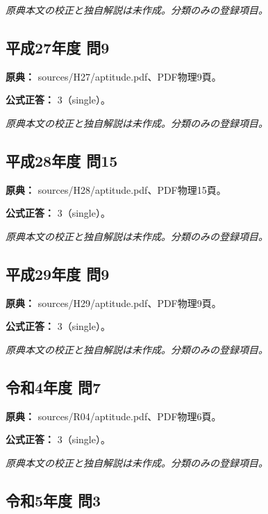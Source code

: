 \par\textit{原典本文の校正と独自解説は未作成。分類のみの登録項目。}

\subsection{平成27年度 問9}
\label{q:h27-reg-apt-09}

\noindent\textbf{原典：} sources/H27/aptitude.pdf、PDF物理9頁。

\textbf{公式正答：} 3（single）。

\par\textit{原典本文の校正と独自解説は未作成。分類のみの登録項目。}

\subsection{平成28年度 問15}
\label{q:h28-reg-apt-15}

\noindent\textbf{原典：} sources/H28/aptitude.pdf、PDF物理15頁。

\textbf{公式正答：} 3（single）。

\par\textit{原典本文の校正と独自解説は未作成。分類のみの登録項目。}

\subsection{平成29年度 問9}
\label{q:h29-reg-apt-09}

\noindent\textbf{原典：} sources/H29/aptitude.pdf、PDF物理9頁。

\textbf{公式正答：} 3（single）。

\par\textit{原典本文の校正と独自解説は未作成。分類のみの登録項目。}

\subsection{令和4年度 問7}
\label{q:r04-reg-apt-07}

\noindent\textbf{原典：} sources/R04/aptitude.pdf、PDF物理6頁。

\textbf{公式正答：} 3（single）。

\par\textit{原典本文の校正と独自解説は未作成。分類のみの登録項目。}

\subsection{令和5年度 問3}
\label{q:r05-reg-apt-03}

